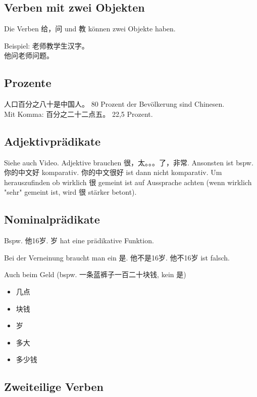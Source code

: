 \documentclass[UTF8]{ctexart}
\begin{document}
\subsection{Verben mit zwei Objekten}

Die Verben 给，问 und 教 können zwei Objekte haben.

Beispiel: 老师教学生汉字。\\
他问老师问题。

\subsection{Prozente}

人口百分之八十是中国人。 80 Prozent der Bevölkerung sind Chinesen.\\
Mit Komma: 百分之二十二点五。 22,5 Prozent.

\subsection{Adjektivprädikate}

Siehe auch Video. Adjektive brauchen 很，太。。。了，非常. Ansonsten ist bspw. 你的中文好 komparativ. 你的中文很好 ist dann nicht komparativ. Um herauszufinden ob wirklich 很 gemeint ist auf Aussprache achten (wenn wirklich "sehr" gemeint ist, wird 很 stärker betont).

\subsection{Nominalprädikate}

Bspw. 他16岁. 岁 hat eine prädikative Funktion.

Bei der Verneinung braucht man ein 是. 他不是16岁. 他不16岁 ist falsch.

Auch beim Geld (bspw. 一条蓝裤子一百二十块钱, kein 是)

\begin{itemize}
    \item 几点
    \item 块钱
    \item 岁
    \item 多大
    \item 多少钱
\end{itemize}

\subsection{Zweiteilige Verben}
\end{document}
